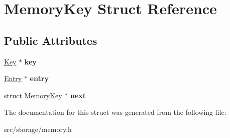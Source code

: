 \hypertarget{struct_memory_key}{}\section{Memory\+Key Struct Reference}
\label{struct_memory_key}
\subsection*{Public Attributes}
\begin{DoxyCompactItemize}
\item 
\hypertarget{struct_memory_key_a46a07af7eda56c38a4ce11463de17d0f}{}\hyperlink{struct_key}{Key} $\ast$ {\bfseries key}\label{struct_memory_key_a46a07af7eda56c38a4ce11463de17d0f}

\item 
\hypertarget{struct_memory_key_a689fa5feea6bb31af1d3095e97f3eb01}{}\hyperlink{struct_entry}{Entry} $\ast$ {\bfseries entry}\label{struct_memory_key_a689fa5feea6bb31af1d3095e97f3eb01}

\item 
\hypertarget{struct_memory_key_a15fdc0e2f3a88f02b5864451070ea935}{}struct \hyperlink{struct_memory_key}{Memory\+Key} $\ast$ {\bfseries next}\label{struct_memory_key_a15fdc0e2f3a88f02b5864451070ea935}

\end{DoxyCompactItemize}


The documentation for this struct was generated from the following file\+:\begin{DoxyCompactItemize}
\item 
src/storage/memory.\+h\end{DoxyCompactItemize}
